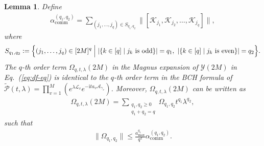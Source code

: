 \documentclass[11pt]{article}
\newtheorem{lemma}{Lemma}
\newcommand{\eq}[1]{(\ref{eq:#1})}
\renewcommand{\i}{\mathrm{i}}
\renewcommand{\P}{\mathcal{P}}
\newcommand{\A}{\mathcal{A}}
\renewcommand{\comm}{\mathrm{comm}}
\newcommand{\mc}{\mathcal}
\begin{document}
\begin{lemma}
\label{lem:magnus-bch}
    Define \begin{align}
    \label{eq:alpha-q-q}
    \alpha_{\comm}^{(q_1, q_2)}=\sum_{(j_1, \ldots, j_q)\in S_{q_1, q_2}}\big\|[\mc K_{j_1}, \mc K_{j_2},\ldots,\mc K_{j_q}]\big\|,
    \end{align}
    where \begin{align}
    \label{eq:S-q-q}
        S_{q_1, q_2}:=\Bigl\{(j_1, \ldots, j_q)\in [2M]^q\Bigm| |\{k\in [q]\mid j_k \text{ is  odd}\}|=q_1,~
        |\{k\in [q]\mid j_k \text{ is  even}\}|=q_2\Bigr\}.
    \end{align}
    The $q$-th order term $\Omega_{q,t,\lambda}(2M)$ in the Magnus expansion of $\mc Y(2M)$ in Eq.~\eq{df-eq} is identical to the $q$-th order term in the BCH formula of $\tilde{\P}(t,\lambda)=\prod_{v=1}^M\left( e^{\lambda \mc L_{v}} e^{-\i t a_{v} \A_{\gamma_v}} \right)$. Moreover, $\Omega_{q,t,\lambda}(2M)$ can be written as \begin{align}
    \Omega_{q,t,\lambda}(2M)= \sum_{\substack{q_1, q_2 \ge 0\\q_1+q_2 = q}}\Omega_{q_1, q_2} t^{q_1}\lambda^{q_2},
    \end{align}
    such that \begin{align}
    \|\Omega_{q_1, q_2}\|\le \frac{a_{\max}^{q_1}}{q^2}\alpha_{\comm}^{(q_1, q_2)}.
    \end{align}
\end{lemma}
\end{document}
